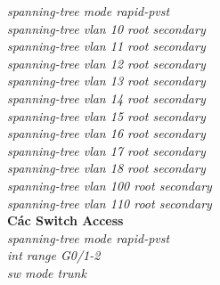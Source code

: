 \documentclass[12pt,a4paper]{report}
\begin{document}
\hspace*{2cm}\textit{spanning-tree mode rapid-pvst\\
\hspace*{2cm}spanning-tree vlan 10 root secondary\\
\hspace*{2cm}spanning-tree vlan 11 root secondary\\
\hspace*{2cm}spanning-tree vlan 12 root secondary\\
\hspace*{2cm}spanning-tree vlan 13 root secondary\\
\hspace*{2cm}spanning-tree vlan 14 root secondary\\
\hspace*{2cm}spanning-tree vlan 15 root secondary\\
\hspace*{2cm}spanning-tree vlan 16 root secondary\\
\hspace*{2cm}spanning-tree vlan 17 root secondary\\
\hspace*{2cm}spanning-tree vlan 18 root secondary\\
\hspace*{2cm}spanning-tree vlan 100 root secondary \\
\hspace*{2cm}spanning-tree vlan 110 root secondary \\}
\hspace*{2cm}\textbf{Các Switch Access}\\
\hspace*{2cm}\textit{spanning-tree mode rapid-pvst\\
\hspace*{2cm}int range G0/1-2\\
\hspace*{2cm}sw mode trunk\\}
\end{document}
